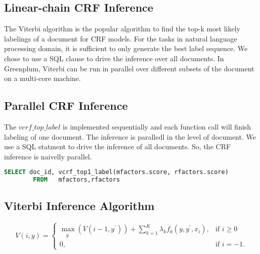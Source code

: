 \begin{itemize}
\section{Linear-chain CRF Inference}
The Viterbi algorithm is the popular algorithm to find the top-k most likely labelings of a document for CRF models. 
For the tasks in natural language processing domain, it is sufficient to only generate the best label sequence.  
We chose to use a SQL clause to drive the inference over all documents. 
In Greenplum, Viterbi can be run in parallel over different subsets of the document on a multi-core machine.

\subsection{Parallel CRF Inference}
The $vcrf\_top\_label$ is implemented sequentially and each function call will finish labeling of one document. 
The inference is paralledl in the level of document. We use a SQL statment to drive the inference of all documents.
So, the CRF inference is naivelly parallel. 
\begin{lstlisting}[language=SQL,gobble=4]
        SELECT doc_id, vcrf_top1_label(mfactors.score, rfactors.score)
        FROM   mfactors,rfactors
\end{lstlisting}

\subsection{Viterbi Inference Algorithm}
\[
V(i,y) =
\begin{cases}
 \max_{y^\prime}(V(i-1,y^\prime)) + \textstyle \sum_{k=1}^K \lambda_kf_k(y,y^\prime,x_i), & \text{if } i\ge0 \\
 0, & \text{if } i=-1.
\end{cases}
\]


\end{itemize}

